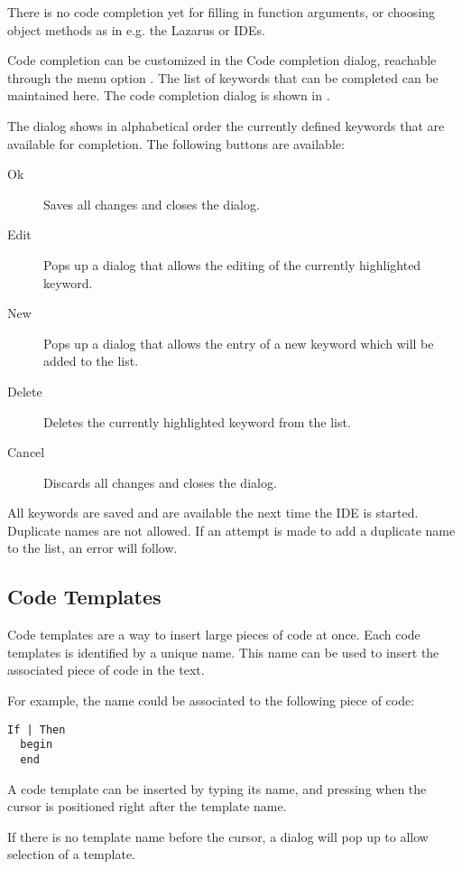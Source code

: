 There is no code completion yet for filling in function arguments, or choosing
object methods as in e.g. the Lazarus or \delphi IDEs.

Code completion can be customized in the Code completion dialog, reachable
through the menu option .
The list of keywords that can be completed can be maintained here.
The code completion dialog is shown in .


The dialog shows in alphabetical order the currently defined keywords 
that are available for completion. The following buttons are available:
\begin{description}
\item[Ok] Saves all changes and closes the dialog.
\item[Edit] Pops up a dialog that allows the editing of the currently
highlighted keyword.
\item[New] Pops up a dialog that allows the entry of a new keyword which will be
added to the list.
\item[Delete] Deletes the currently highlighted keyword from the list.
\item[Cancel] Discards all changes and closes the dialog.
\end{description}
All keywords are saved and are available the next time the IDE is started.
Duplicate names are not allowed. If an attempt is made to add a duplicate
name to the list, an error will follow.

\subsection{Code Templates}
Code templates are a way to insert large pieces of code at once. Each
code templates is identified by a unique name. This name can be used to
insert the associated piece of code in the text.

For example, the name  could be associated to the following
piece of code:
\begin{verbatim}
If | Then
  begin
  end
\end{verbatim}
A code template can be inserted by typing its name, and pressing 
when the cursor is positioned right after the template name.

If there is no template name before the cursor, a dialog will pop up to
allow selection of a template.

